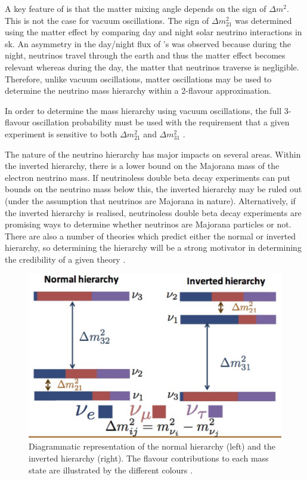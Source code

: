 A key feature of  is that the matter mixing angle depends on the sign of $\Delta m^2$. This is not the case for vacuum oscillations. The sign of $\Delta m^2_{21}$ was determined using the matter effect by comparing day and night solar neutrino interactions in \gls{sk}. An asymmetry in the day/night flux of \nue's was observed because during the night, neutrinos travel through the earth and thus the matter effect becomes relevant whereas during the day, the matter that neutrinos traverse is negligible. Therefore, unlike vacuum oscillations, matter oscillations may be used to determine the neutrino mass hierarchy within a 2-flavour approximation.

In order to determine the mass hierarchy using vacuum oscillations, the full 3-flavour oscillation probability must be used with the requirement that a given experiment is sensitive to both $\Delta m^2_{21}$ and $\Delta m^2_{31}$ \cite{mass_hierarchy_discussion}\cite{Neutrino_Mass_Hierarchy_Vacuum_Oscillations_and_Vanishing_Ue3}.

The nature of the neutrino hierarchy has major impacts on several areas. Within the inverted hierarchy, there is a lower bound on the Majorana mass of the electron neutrino mass. If neutrinoless double beta decay experiments can put bounds on the neutrino mass below this, the inverted hierarchy may be ruled out (under the assumption that neutrinos are Majorana in nature). Alternatively, if the inverted hierarchy is realised, neutrinoless double beta decay experiments are promising ways to determine whether neutrinos are Majorana particles or not. There are also a number of theories which predict either the normal or inverted hierarchy, so determining the hierarchy will be a strong motivator in determining the credibility of a given theory \cite{mass_hierarchy}.

\begin{figure}[h!]
    \centering
    \includegraphics[width = \largefigwidth]{figures-chap2/mass_hierarchy-crop.pdf}
    \caption[Neutrino hierarchy.]{Diagrammatic representation of the normal hierarchy (left) and the inverted hierarchy (right). The flavour contributions to each mass state are illustrated by the different colours \cite{mass_hierarchy_image_2}.}
    \label{fig:mass_hierarchy}
\end{figure}



